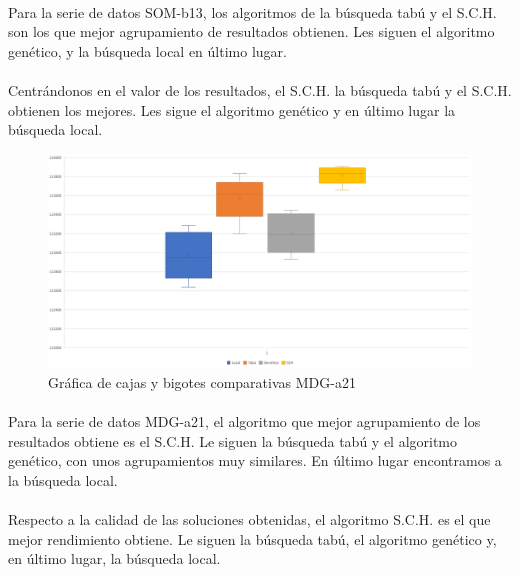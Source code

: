 	\paragraph{}Para la serie de datos SOM-b13, los algoritmos de la búsqueda tabú y el S.C.H. son los que mejor agrupamiento de resultados obtienen. Les siguen el algoritmo genético, y la búsqueda local en último lugar.
	
	\paragraph{}Centrándonos en el valor de los resultados, el S.C.H. la búsqueda tabú y el S.C.H. obtienen los mejores. Les sigue el algoritmo genético y en último lugar la búsqueda local.

	\begin{figure}[H]
		\centering
		\includegraphics[scale=0.3]{img/finalMDG1.png}
		\caption{Gráfica de cajas y bigotes comparativas MDG-a21}
		\label{MDG-a21_final}
	\end{figure}

	\paragraph{}Para la serie de datos MDG-a21, el algoritmo que mejor agrupamiento de los resultados obtiene es el S.C.H. Le siguen la búsqueda tabú y el algoritmo genético, con unos agrupamientos muy similares. En último lugar encontramos a la búsqueda local.
	
	\paragraph{}Respecto a la calidad de las soluciones obtenidas, el algoritmo S.C.H. es el que mejor rendimiento obtiene. Le siguen la búsqueda tabú, el algoritmo genético y, en último lugar, la búsqueda local.

